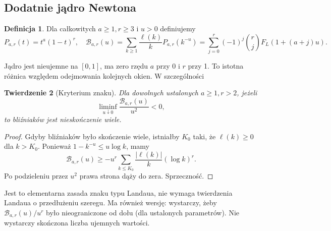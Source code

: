\documentclass[11pt,a4paper]{article}
\newtheorem{tw}{Twierdzenie}[section]
\theoremstyle{definition}\newtheorem{defn}[tw]{Definicja}
\theoremstyle{remark}\newtheorem*{uw}{Uwaga}
\newcommand{\B}{\mathcal B}
\begin{document}
\subsection{Dodatnie jądro Newtona}
\begin{defn}
Dla całkowitych $a\ge1,r\ge3$ i $u>0$ definiujemy
\begin{equation}\label{eq:kernel}
 P_{a,r}(t)=t^a(1-t)^r,\quad
 \B_{a,r}(u)=\sum_{k\ge1}\frac{\ell(k)}{k}P_{a,r}(k^{-u})
 =\sum_{j=0}^r(-1)^j\binom rj F_L(1+(a+j)u).
\end{equation}
\end{defn}
Jądro jest nieujemne na $[0,1]$, ma zero rzędu $a$ przy 0 i $r$ przy 1.
To istotna różnica względem odejmowania kolejnych okien. W szczególności
\begin{tw}[Kryterium znaku]\label{th:kernel}
Dla dowolnych ustalonych $a\ge1,r>2$, jeżeli
\[
 \boxed{\liminf_{u\downarrow0}\frac{\B_{a,r}(u)}{u^2}<0,}
\]
to bliźniaków jest nieskończenie wiele.
\end{tw}
\begin{proof}
Gdyby bliźniaków było skończenie wiele, istniałby $K_0$ taki, że
$\ell(k)\ge0$ dla $k>K_0$. Ponieważ $1-k^{-u}\le u\log k$, mamy
\[
 \B_{a,r}(u)\ge -u^r\sum_{k\le K_0}\frac{|\ell(k)|}{k}(\log k)^r.
\]
Po podzieleniu przez $u^2$ prawa strona dąży do zera. Sprzeczność.
\end{proof}
Jest to elementarna zasada znaku typu Landaua, nie wymaga twierdzenia
Landaua o przedłużeniu szeregu. Ma również wersję: wystarczy, żeby
$\B_{a,r}(u)/u^r$ było nieograniczone od dołu (dla ustalonych parametrów).
Nie wystarczy skończona liczba ujemnych wartości.
\end{document}
